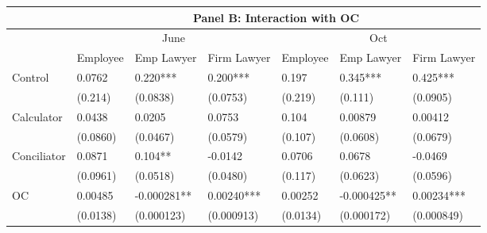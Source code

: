 \begin{tabular}{rrrrrrr}
\toprule
      & \multicolumn{6}{c}{Panel B: Interaction with OC} \\
\midrule
\multicolumn{1}{l}{} & \multicolumn{3}{c}{June} & \multicolumn{3}{c}{Oct} \\
\multicolumn{1}{l}{} & \multicolumn{1}{c}{Employee } & \multicolumn{1}{c}{Emp Lawyer } & \multicolumn{1}{c}{Firm Lawyer } & \multicolumn{1}{c}{Employee } & \multicolumn{1}{c}{Emp Lawyer } & \multicolumn{1}{c}{Firm Lawyer } \\
\midrule
\multicolumn{1}{l}{Control} & \multicolumn{1}{l}{0.0762} & \multicolumn{1}{l}{0.220***} & \multicolumn{1}{l}{0.200***} & \multicolumn{1}{l}{0.197} & \multicolumn{1}{l}{0.345***} & \multicolumn{1}{l}{0.425***} \\
\multicolumn{1}{l}{} & \multicolumn{1}{l}{(0.214)} & \multicolumn{1}{l}{(0.0838)} & \multicolumn{1}{l}{(0.0753)} & \multicolumn{1}{l}{(0.219)} & \multicolumn{1}{l}{(0.111)} & \multicolumn{1}{l}{(0.0905)} \\
\multicolumn{1}{l}{Calculator} & \multicolumn{1}{l}{0.0438} & \multicolumn{1}{l}{0.0205} & \multicolumn{1}{l}{0.0753} & \multicolumn{1}{l}{0.104} & \multicolumn{1}{l}{0.00879} & \multicolumn{1}{l}{0.00412} \\
\multicolumn{1}{l}{} & \multicolumn{1}{l}{(0.0860)} & \multicolumn{1}{l}{(0.0467)} & \multicolumn{1}{l}{(0.0579)} & \multicolumn{1}{l}{(0.107)} & \multicolumn{1}{l}{(0.0608)} & \multicolumn{1}{l}{(0.0679)} \\
\multicolumn{1}{l}{Conciliator} & \multicolumn{1}{l}{0.0871} & \multicolumn{1}{l}{0.104**} & \multicolumn{1}{l}{-0.0142} & \multicolumn{1}{l}{0.0706} & \multicolumn{1}{l}{0.0678} & \multicolumn{1}{l}{-0.0469} \\
\multicolumn{1}{l}{} & \multicolumn{1}{l}{(0.0961)} & \multicolumn{1}{l}{(0.0518)} & \multicolumn{1}{l}{(0.0480)} & \multicolumn{1}{l}{(0.117)} & \multicolumn{1}{l}{(0.0623)} & \multicolumn{1}{l}{(0.0596)} \\
\multicolumn{1}{l}{OC} & \multicolumn{1}{l}{0.00485} & \multicolumn{1}{l}{-0.000281**} & \multicolumn{1}{l}{0.00240***} & \multicolumn{1}{l}{0.00252} & \multicolumn{1}{l}{-0.000425**} & \multicolumn{1}{l}{0.00234***} \\
\multicolumn{1}{l}{} & \multicolumn{1}{l}{(0.0138)} & \multicolumn{1}{l}{(0.000123)} & \multicolumn{1}{l}{(0.000913)} & \multicolumn{1}{l}{(0.0134)} & \multicolumn{1}{l}{(0.000172)} & \multicolumn{1}{l}{(0.000849)} \\

\end{tabular}
